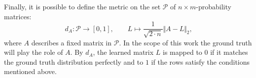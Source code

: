Finally, it is possible to define the metric on the set $ \mathcal{P} $ of $ n \times m $-probability matrices:
\begin{equation}
	d_A \colon \mathcal{P} \to [0,1], \qquad L \mapsto \frac{1}{\sqrt{2 \cdot n}}\Vert A - L \Vert_2
	\text{,}
\end{equation}
where $ A $ describes a fixed matrix in $ \mathcal{P} $. In the scope of this work the ground truth will play the role of $ A $. By $ d_A $, the learned matrix $ L $ is mapped to $ 0 $ if it matches the ground truth distribution perfectly and to $ 1 $ if the rows satisfy the conditions mentioned above.


